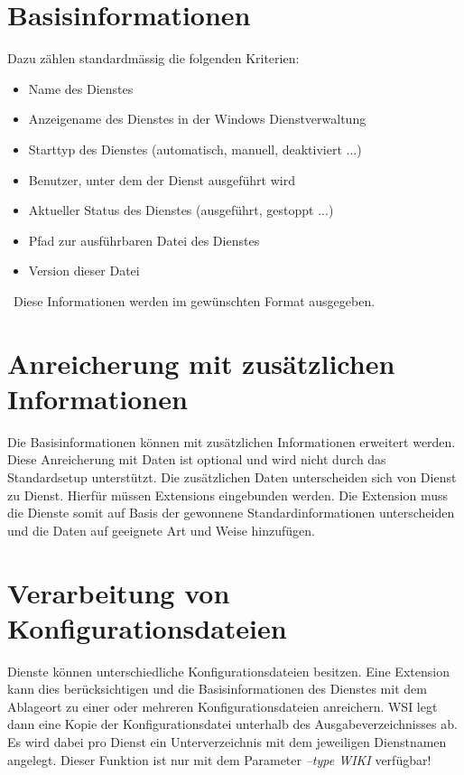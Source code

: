 \documentclass[11pt,DIV=15]{scrreprt}
\begin{document}
\section{Basisinformationen}
Dazu zählen standardmässig die folgenden Kriterien:

\begin{itemize}
	\item Name des Dienstes
	\item Anzeigename des Dienstes in der Windows Dienstverwaltung
	\item Starttyp des Dienstes (automatisch, manuell, deaktiviert ...)
	\item Benutzer, unter dem der Dienst ausgeführt wird
	\item Aktueller Status des Dienstes (ausgeführt, gestoppt ...)
	\item Pfad zur ausführbaren Datei des Dienstes
	\item Version dieser Datei	
\end{itemize} 

\ Diese Informationen werden im gewünschten Format ausgegeben.

\section{Anreicherung mit zusätzlichen Informationen}

Die Basisinformationen können mit zusätzlichen Informationen erweitert werden. Diese \glqq Anreicherung\grqq{} mit Daten ist optional und wird nicht durch das Standardsetup unterstützt. Die zusätzlichen Daten unterscheiden sich von Dienst zu Dienst. Hierfür müssen Extensions eingebunden werden.  Die Extension muss die Dienste somit auf Basis der gewonnene Standardinformationen unterscheiden und die Daten auf geeignete Art und Weise hinzufügen.

\section{Verarbeitung von Konfigurationsdateien}
Dienste können unterschiedliche Konfigurationsdateien besitzen. Eine Extension kann dies berücksichtigen und die Basisinformationen des Dienstes mit dem Ablageort zu einer oder mehreren Konfigurationsdateien anreichern. WSI legt dann eine Kopie der Konfigurationsdatei unterhalb des Ausgabeverzeichnisses ab. Es wird dabei pro Dienst ein Unterverzeichnis mit dem jeweiligen Dienstnamen angelegt. Dieser Funktion ist nur mit dem Parameter \emph{--type WIKI} verfügbar!
\end{document}
